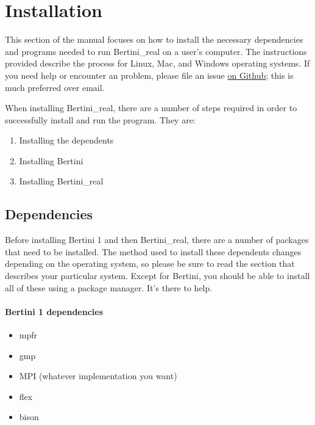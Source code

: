 
\section{Installation}
\label{sec:installation}


This section of the manual focuses on how to install the necessary dependencies and programs needed to run Bertini\_real on a user's computer. The instructions provided describe the process for Linux, Mac, and Windows operating systems.  If you need help or encounter an problem, please file an issue \href{https://github.com/ofloveandhate/bertini_real/issues}{on Github}; this is much preferred over email.

When installing Bertini\_real, there are a number of steps required in order to successfully install and run the program. They are:
\begin{enumerate}
\item Installing the \glspl{dependent}
\item Installing Bertini
\item Installing Bertini\_real
\end{enumerate}




\subsection{Dependencies}
\label{sec:deps}

Before installing Bertini 1 and then Bertini\_real, there are a number of packages that need to be installed. The method used to install these \glspl{dependent} changes depending on the operating system, so please be sure to read the section that describes your particular system.  Except for Bertini, you should be able to install all of these using a package manager.  It's there to help.

\paragraph{Bertini 1 dependencies}

\begin{itemize}[noitemsep]
\item \gls{mpfr}
\item \gls{gmp}
\item MPI (whatever implementation you want)
\item flex
\item bison
\end{itemize}


